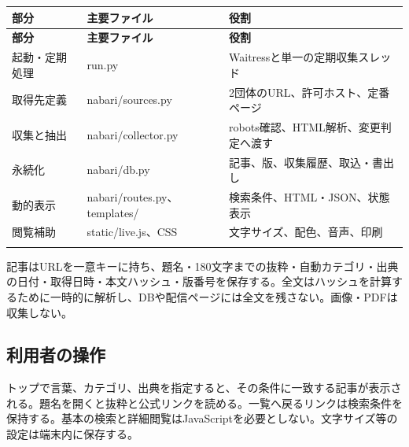 \documentclass[a4paper,10pt]{ltjsarticle}
\begin{document}
{\small\begin{longtable}{@{}>{\raggedright\arraybackslash}p{}>{\raggedright\arraybackslash}p{}>{\raggedright\arraybackslash}p{}@{}}

\rowcolor{Pale}\textbf{部分} & \textbf{主要ファイル} & \textbf{役割} \\ \midrule

\endfirsthead

\rowcolor{Pale}\textbf{部分} & \textbf{主要ファイル} & \textbf{役割} \\ \midrule\endhead

起動・定期処理 & run.py & Waitressと単一の定期収集スレッド \\ \addlinespace[3pt]

取得先定義 & nabari/sources.py & 2団体のURL、許可ホスト、定番ページ \\ \addlinespace[3pt]

収集と抽出 & nabari/collector.py & robots確認、HTML解析、変更判定へ渡す \\ \addlinespace[3pt]

永続化 & nabari/db.py & 記事、版、収集履歴、取込・書出し \\ \addlinespace[3pt]

動的表示 & nabari/routes.py、templates/ & 検索条件、HTML・JSON、状態表示 \\ \addlinespace[3pt]

閲覧補助 & static/live.js、CSS & 文字サイズ、配色、音声、印刷 \\ \addlinespace[3pt]

\bottomrule\end{longtable}}

記事はURLを一意キーに持ち、題名・180文字までの抜粋・自動カテゴリ・出典の日付・取得日時・本文ハッシュ・版番号を保存する。全文はハッシュを計算するために一時的に解析し、DBや配信ページには全文を残さない。画像・PDFは収集しない。


\subsection*{利用者の操作}

トップで言葉、カテゴリ、出典を指定すると、その条件に一致する記事が表示される。題名を開くと抜粋と公式リンクを読める。一覧へ戻るリンクは検索条件を保持する。基本の検索と詳細閲覧はJavaScriptを必要としない。文字サイズ等の設定は端末内に保存する。
\end{document}
